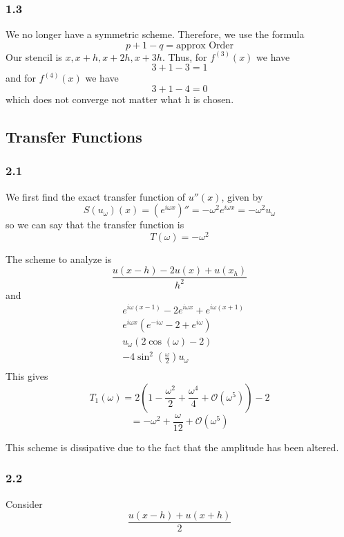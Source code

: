 \subsubsection{1.3}
We no longer have a symmetric scheme. Therefore, we use the formula 
\[
p + 1 - q = \text{approx Order} 
\]
Our stencil is $ x, x+h, x+2h, x+3h $. Thus, for $ f _{  }^{ (3) } (x) $ we have 
\[
3 + 1 - 3 = 1
\]
and for $ f _{  }^{ (4) } (x) $ we have 
\[
3 + 1 - 4 = 0
\] which does not converge not matter what h is chosen. 

\subsection{Transfer Functions }
\label{subsec:Transfer Functions }
\subsubsection{2.1}
We first find the exact transfer function of $ u''(x) $, given by 
\[
    S \left( u_{\omega} \right) \left( x\right) = \left( e _{  }^{ i\omega x } \right) ''
    = -\omega^2 e _{  }^{ i\omega x } = -\omega^2 u _{ \omega }^{  } 
\] 
so we can say that the transfer function is 
\[
T\left( \omega\right) = -\omega^2
\]

The scheme to analyze is 
\[
\frac{ u(x-h) - 2u(x) + u(x_h)  }{ h^2 } 
\]
and 
\begin{align*}
   &e^{ i\omega\left( x-1\right) } - 2 e^{ i\omega x} + e^{ i\omega\left( x+1\right) } \\ 
    & e^{ i\omega x} \left( e^{ -i\omega } - 2 + e^{ i\omega }  \right)  \\ 
    & u _{ \omega }^{  } \left( 2\cos(\omega) - 2\right)   \\ 
    & -4\sin^2\left( \frac{ \omega }{ 2 } \right)u_{\omega}  \\ 
\end{align*}
This gives 
\[
T_1\left( \omega \right) = 2\left( 1 - \frac{ \omega^2 }{ 2 } + \frac{ \omega^4 }{ 4  } +
\mathcal{ O  } \left( \omega^5\right) \right) - 2
\]
\[
= -\omega^2 + \frac{ \omega }{ 12 } + \mathcal{ O  } \left( \omega ^5\right) 
\]

This scheme is dissipative due to the fact that the amplitude has been altered.


\subsubsection{2.2}
Consider 
\[
    \frac{ u(x-h) + u(x+h)  }{ 2 } 
\]

